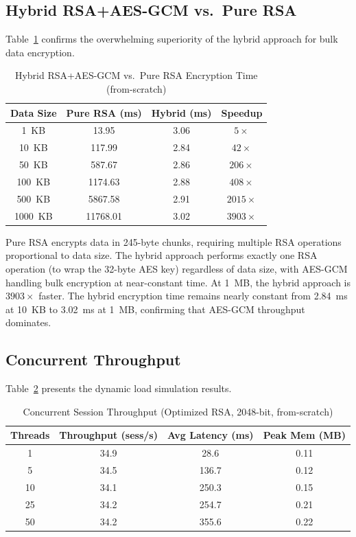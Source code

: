 \documentclass[journal]{IEEEtran}
\begin{document}
\subsection{Hybrid RSA+AES-GCM vs.\ Pure RSA}

Table~\ref{tab:hybrid} confirms the overwhelming superiority of the hybrid approach for bulk data encryption.

\begin{table}[H]
\caption{Hybrid RSA+AES-GCM vs.\ Pure RSA Encryption Time (from-scratch)}
\label{tab:hybrid}
\centering
\begin{tabular}{|c|c|c|c|}
\hline
\textbf{Data Size} & \textbf{Pure RSA (ms)} & \textbf{Hybrid (ms)} & \textbf{Speedup} \\
\hline
1~KB & 13.95 & 3.06 & $5\times$ \\
\hline
10~KB & 117.99 & 2.84 & $42\times$ \\
\hline
50~KB & 587.67 & 2.86 & $206\times$ \\
\hline
100~KB & 1174.63 & 2.88 & $408\times$ \\
\hline
500~KB & 5867.58 & 2.91 & $2015\times$ \\
\hline
1000~KB & 11768.01 & 3.02 & $3903\times$ \\
\hline
\end{tabular}
\end{table}

Pure RSA encrypts data in 245-byte chunks, requiring multiple RSA operations proportional to data size. The hybrid approach performs exactly one RSA operation (to wrap the 32-byte AES key) regardless of data size, with AES-GCM handling bulk encryption at near-constant time. At 1~MB, the hybrid approach is $3903\times$ faster. The hybrid encryption time remains nearly constant from 2.84~ms at 10~KB to 3.02~ms at 1~MB, confirming that AES-GCM throughput dominates.

\subsection{Concurrent Throughput}

Table~\ref{tab:concurrency} presents the dynamic load simulation results.

\begin{table}[H]
\caption{Concurrent Session Throughput (Optimized RSA, 2048-bit, from-scratch)}
\label{tab:concurrency}
\centering
\begin{tabular}{|c|c|c|c|}
\hline
\textbf{Threads} & \textbf{Throughput (sess/s)} & \textbf{Avg Latency (ms)} & \textbf{Peak Mem (MB)} \\
\hline
1 & 34.9 & 28.6 & 0.11 \\
\hline
5 & 34.5 & 136.7 & 0.12 \\
\hline
10 & 34.1 & 250.3 & 0.15 \\
\hline
25 & 34.2 & 254.7 & 0.21 \\
\hline
50 & 34.2 & 355.6 & 0.22 \\
\hline
\end{tabular}
\end{table}
\end{document}
